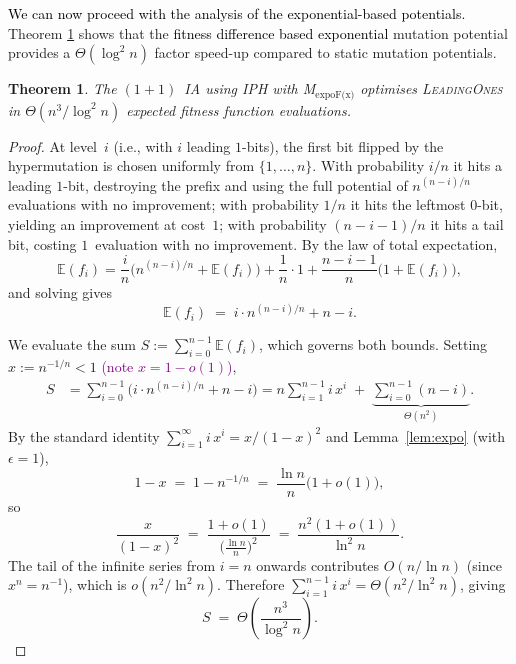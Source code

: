 \documentclass[lettersize,journal]{IEEEtran}
\newcommand{\rerev}[1]{\textcolor{purple}{#1}}
\newcommand{\rev}[1]{\textcolor{black}{#1}}
\newcommand{\EE}{\mathbb{E}}
\newcommand{\oneoneIA}{$(1+1)$~IA}
\newcommand{\expoF}{M$_{\text{expoF(x)}}$}
\newcommand{\IPHfcm}{IPH}
\newtheorem{theorem}{Theorem}
\begin{document}
\rev{We can now proceed with the analysis of the exponential-based potentials.}
Theorem \ref{expohdOnLO} shows that the \rev{fitness difference based exponential}
     mutation potential provides a $\Theta(\log^2 n)$ factor
     speed-up compared to static mutation potentials. 



\begin{theorem} \label{expohdOnLO}
The {\oneoneIA } using \IPHfcm{} with {\expoF } optimises
\textsc{LeadingOnes} in $\Theta(n^3/\log^2 n)$ expected fitness function
evaluations.
\end{theorem}

\begin{proof}
At level~$i$ (i.e., with $i$ leading $1$-bits), the first bit flipped by the
hypermutation is chosen uniformly from $\{1,\dots,n\}$.  With probability
$i/n$ it hits a leading $1$-bit, destroying the prefix and using the full
potential of $n^{(n-i)/n}$ evaluations with no improvement; with probability
$1/n$ it hits the leftmost $0$-bit, yielding an improvement at cost~$1$; with
probability $(n-i-1)/n$ it hits a tail bit, costing $1$~evaluation with no
improvement.  By the law of total expectation,
\[
\EE(f_i)
= \frac{i}{n}\bigl(n^{(n-i)/n}+\EE(f_i)\bigr)
  +\frac{1}{n}\cdot 1
  +\frac{n-i-1}{n}\bigl(1+\EE(f_i)\bigr),
\]
and solving gives
\begin{equation}\label{eq:Efi-expoF}
\EE(f_i) \;=\; i\cdot n^{(n-i)/n} + n - i.
\end{equation}

We evaluate the sum
$S := \sum_{i=0}^{n-1} \EE(f_i)$, which governs both bounds.
Setting $x:=n^{-1/n}<1$ \rerev{(note $x=1-o(1)$)},
\begin{align*}
S
&= \sum_{i=0}^{n-1}\bigl(i\cdot n^{(n-i)/n}+n-i\bigr)
 = n\sum_{i=1}^{n-1} i\,x^{i}
   \;+\;\underbrace{\sum_{i=0}^{n-1}(n-i)}_{\Theta(n^2)}.
\end{align*}
By the standard identity $\sum_{i=1}^{\infty} i\,x^i = x/(1-x)^2$
and Lemma~\ref{lem:expo} (with $\epsilon=1$),
\[
1-x \;=\; 1 - n^{-1/n}
    \;=\; \frac{\ln n}{n}\bigl(1+o(1)\bigr),
\]
so
\[
\frac{x}{(1-x)^2}
\;=\; \frac{1+o(1)}{\bigl(\frac{\ln n}{n}\bigr)^2}
\;=\; \frac{n^2(1+o(1))}{\ln^2 n}.
\]
The tail of the infinite series from $i=n$ onwards contributes
$O(n/\ln n)$ (since $x^n = n^{-1}$), which is $o(n^2/\ln^2 n)$.
Therefore $\sum_{i=1}^{n-1} i\,x^{i} = \Theta(n^2/\ln^2 n)$, giving
\begin{equation}\label{eq:S-expoF}
S \;=\; \Theta\!\left(\frac{n^3}{\log^2 n}\right).
\end{equation}


\end{proof}
\end{document}
